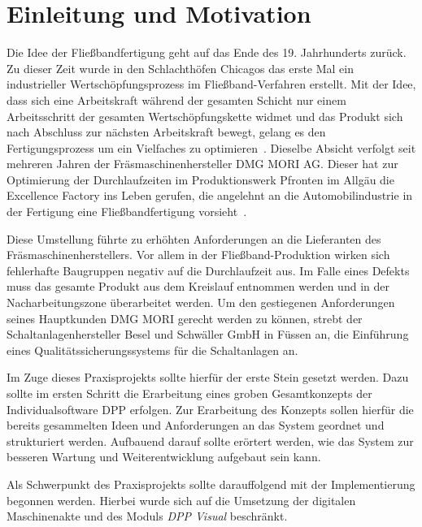 \documentclass[
    type=Prakikumsbericht,
    status=draft, %
    language=german, %
    bibengine=bibtex,
]{unibwm-inf-thesis}
\begin{document}
    \tableofcontents

    \mainmatter

    \chapter{Einleitung und Motivation}
    Die Idee der Fließbandfertigung geht auf das Ende des 19. Jahrhunderts zurück.
    Zu dieser Zeit wurde in den Schlachthöfen Chicagos das erste Mal ein industrieller Wertschöpfungsprozess im Fließband-Verfahren erstellt.
    Mit der Idee, dass sich eine Arbeitskraft während der gesamten Schicht nur einem Arbeitsschritt der gesamten Wertschöpfungskette widmet und das Produkt sich nach Abschluss zur nächsten Arbeitskraft bewegt, gelang es den Fertigungsprozess um ein Vielfaches zu optimieren~\citep{Pretting2006}.
    Dieselbe Absicht verfolgt seit mehreren Jahren der Fräsmaschinenhersteller DMG MORI AG.
    Dieser hat zur Optimierung der Durchlaufzeiten im Produktionswerk Pfronten im Allgäu die Excellence Factory ins Leben gerufen, die angelehnt an die Automobilindustrie in der Fertigung eine Fließbandfertigung vorsieht~\citep{DMG2020}.

    Diese Umstellung führte zu erhöhten Anforderungen an die Lieferanten des Fräsmaschinenherstellers.
    Vor allem in der Fließband-Produktion wirken sich fehlerhafte Baugruppen negativ auf die Durchlaufzeit aus.
    Im Falle eines Defekts muss das gesamte Produkt aus dem Kreislauf entnommen werden und in der Nacharbeitungszone überarbeitet werden.
    Um den gestiegenen Anforderungen seines Hauptkunden DMG MORI gerecht werden zu können, strebt der Schaltanlagenhersteller Besel und Schwäller GmbH in Füssen an, die Einführung eines Qualitätssicherungssystems für die Schaltanlagen an.

    Im Zuge dieses Praxisprojekts sollte hierfür der erste Stein gesetzt werden.
    Dazu sollte im ersten Schritt die Erarbeitung eines groben Gesamtkonzepts der Individualsoftware \ac{DPP} erfolgen.
    Zur Erarbeitung des Konzepts sollen hierfür die bereits gesammelten Ideen und Anforderungen an das System geordnet und strukturiert werden.
    Aufbauend darauf sollte erörtert werden, wie das System zur besseren Wartung und Weiterentwicklung aufgebaut sein kann.

    Als Schwerpunkt des Praxisprojekts sollte darauffolgend mit der Implementierung begonnen werden.
    Hierbei wurde sich auf die Umsetzung der digitalen Maschinenakte und des Moduls \textit{\ac{DPP} Visual} beschränkt.
\end{document}
